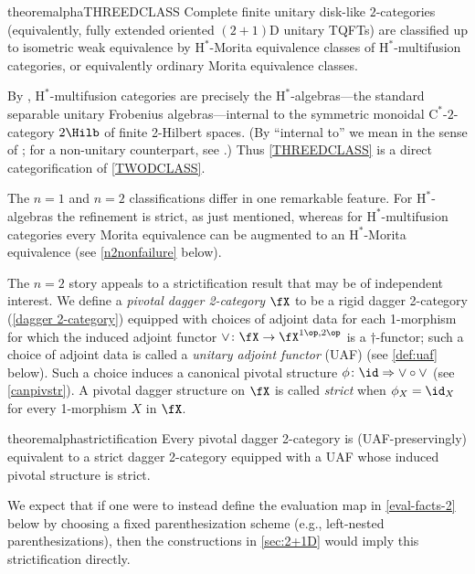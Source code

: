 \documentclass[12pt,reqno]{amsart}
\newcounter{alpha}\renewcommand\thealpha{\upshape\Alph{alpha}}
\newcommand{\Cstar}{\ensuremath{\mathrm{C}^{*}}}
\newcommand{\Hstar}{\ensuremath{\mathrm{H}^{*}}}
\newcommand{\defn}[1]{\emph{#1}}
\begin{document}
\begin{restatable}{theoremalpha}{THREEDCLASS}
\label{THREEDCLASS}
Complete finite unitary disk-like $2$-categories (equivalently, fully extended oriented $(2+1)$D unitary TQFTs) are classified up to isometric weak equivalence by $\Hstar$-Morita equivalence classes of $\Hstar$-multifusion categories, or equivalently ordinary Morita equivalence classes.
\end{restatable}

By \cite[\S6]{3Hilb}, $\Hstar$-multifusion categories are precisely the $\Hstar$-algebras---the standard separable unitary Frobenius algebras---internal to the symmetric monoidal $\Cstar$-$2$-category $2\Hilb$ of finite 2-Hilbert spaces. (By ``internal to'' we mean in the sense of \cite[Defn. 6.8]{3Hilb}; for a non-unitary counterpart, see \cite{Xu26}.) Thus \cref{THREEDCLASS} is a direct categorification of \cref{TWODCLASS}.

The $n=1$ and $n=2$ classifications differ in one remarkable feature. For $\Hstar$-algebras the refinement is strict, as just mentioned, whereas for $\Hstar$-multifusion categories every Morita equivalence can be augmented to an $\Hstar$-Morita equivalence (see \cref{n2nonfailure} below).
 
The $n=2$ story appeals to a strictification result that may be of independent interest. We define a \defn{pivotal dagger 2-category} $\fX$ to be a rigid dagger 2-category (\cref{dagger 2-category}) equipped with choices of adjoint data for each 1-morphism for which the induced adjoint functor $\vee\colon\fX\to\fX^{1\op,2\op}$ is a $\dag$-functor; such a choice of adjoint data is called a \defn{unitary adjoint functor} (UAF) (see \cref{def:uaf} below). Such a choice induces a canonical pivotal structure $\phi\colon\id\Rightarrow\vee\circ\vee$ (see \cref{canpivstr}). A pivotal dagger structure on $\fX$ is called \defn{strict} when $\phi_X=\id_X$ for every 1-morphism $X$ in $\fX$.
 
\begin{restatable}{theoremalpha}{strictification}
\label{strictification}
Every pivotal dagger 2-category is (UAF-preservingly) equivalent to a strict dagger 2-category equipped with a UAF whose induced pivotal structure is strict.
\end{restatable}

We expect that if one were to instead define the evaluation map in \cref{eval-facts-2} below by choosing a fixed parenthesization scheme (e.g., left-nested parenthesizations), then the constructions in \cref{sec:2+1D} would imply this strictification directly. 
 
\end{document}
